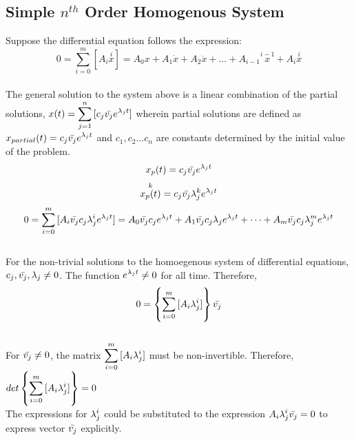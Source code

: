 \documentclass[a4paper, 12pt]{report}
\begin{document}
\begin{center}
\section{Simple $n^{th}$ Order Homogenous System}
\begin{comment}
\end{comment}
Suppose the differential equation follows the expression:
$$0 = \sum_{i = 0}^{m}{[A_i \overset{i}{x}]} = A_0 x + A_1 \dot{x} + A_2 \ddot{x}+ \dots + A_{i - 1} \overset{i -  1}{x} + A_{i} \overset{i}{x}$$
\\The general solution to the system above is a linear combination of the partial solutions, $\displaystyle{x(t) = \sum_{j = 1}^{n}{[c_j \bar{v_j}e^{\lambda_j t}]}}$ wherein partial solutions are defined as $\displaystyle{x_{partial}(t) = c_j \bar{v_j}e^{\lambda_j t}}$ and $c_1, c_2 \dots c_n$ are constants determined by the initial value of the problem. 
$$x_{p}(t) = c_j \bar{v_j}e^{\lambda_j t}$$
$$\overset{k}{x_{p}(t)} = c_j \bar{v_j}\lambda_{j}^k e^{\lambda_j t}$$
$$0 = \sum_{i = 0}^{m}{[A_i \bar{v_j} c_j \lambda_{j}^i e^{\lambda_j t}]} =A_0 \bar{v_j} c_j e^{\lambda_j t} + A_1 \bar{v_j} c_j \lambda_{j} e^{\lambda_j t} + \dots + A_m \bar{v_j} c_j \lambda_{j}^m e^{\lambda_j t}$$
\\For the non-trivial solutions to the homoegenous system of differential equations, $\displaystyle{c_j, \bar{v_j}, \lambda_j \neq 0}$. The function $\displaystyle{e^{\lambda_j t}}\neq 0$ for all time. Therefore, 
$$0 = \left\{ \sum_{i = 0}^{m}{[A_i \lambda_{j}^i]} \right\} \bar{v_j}$$
\\For $\displaystyle{\bar{v_j} \neq 0}$, the matrix $\displaystyle{\sum_{i = 0}^{m}{[A_i \lambda_{j}^i]}}$ must be non-invertible. Therefore, $\displaystyle{det\left\{ \sum_{i = 0}^{m}{[A_i \lambda_{j}^i]} \right\} = 0}$
\\The expressions for $\displaystyle{\lambda_j ^ i}$ could be substituted to the expression $\displaystyle{A_i \lambda_{j}^i} \bar{v_j} = 0$ to express vector $\displaystyle{\bar{v_j}}$ explicitly.






















\end{center}
\end{document}
